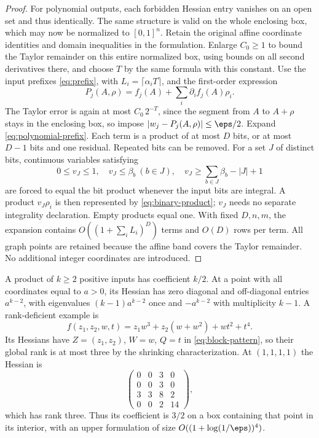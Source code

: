 \begin{proof}
For polynomial outputs, each forbidden Hessian entry vanishes on an
open set and thus identically. The same structure is valid on the
whole enclosing box, which may now be normalized to $[0,1]^n$.
Retain the original affine coordinate identities and domain
inequalities in the formulation. Enlarge $C_0\ge1$ to bound the Taylor
remainder on this entire normalized box, using bounds on all second
derivatives there, and choose $T$ by the same formula with this constant.
Use the input prefixes \eqref{eq:prefix}, with
$L_i=\lceil\alpha_iT\rceil$, and the first-order expression
\begin{equation}\label{eq:polynomial-prefix}
 P_j(A,\rho)=f_j(A)+\sum_i\partial_i f_j(A)\rho_i.
\end{equation}
The Taylor error is again at most $C_0\,2^{-T}$, since the segment
from $A$ to $A+\rho$ stays in the enclosing box, so impose
$|w_j-P_j(A,\rho)|\le\eps/2$. Expand \eqref{eq:polynomial-prefix}.
Each term is a product of at most $D$ bits, or at most $D-1$ bits and
one residual. Repeated bits can be removed. For a set $J$ of distinct
bits, continuous variables satisfying
\[
 0\le v_J\le1,\quad v_J\le\beta_b\ (b\in J),\quad
 v_J\ge\sum_{b\in J}\beta_b-|J|+1
\]
are forced to equal the bit product whenever the input bits are integral.
A product $v_J\rho_i$ is then represented by
\eqref{eq:binary-product}; $v_J$ needs no separate integrality declaration.
Empty products equal one. With fixed $D,n,m$, the expansion contains
$O((1+\sum_iL_i)^D)$ terms and $O(D)$ rows per term. All graph points
are retained because the affine band covers the Taylor remainder.
No additional integer coordinates are introduced.
\end{proof}

A product of $k\ge2$ positive inputs has coefficient $k/2$. At a point
with all coordinates equal to $a>0$, its Hessian has zero diagonal and
off-diagonal entries $a^{k-2}$, with eigenvalues
$(k-1)a^{k-2}$ once and $-a^{k-2}$ with multiplicity $k-1$.
A rank-deficient example is
\[
 f(z_1,z_2,w,t)=z_1w^3+z_2(w+w^2)+wt^2+t^4.
\]
Its Hessians have $Z=(z_1,z_2)$, $W=w$, $Q=t$ in
\eqref{eq:block-pattern}, so their global rank is at most three by the
shrinking characterization. At $(1,1,1,1)$ the Hessian is
\[
 \begin{pmatrix}0&0&3&0\\0&0&3&0\\3&3&8&2\\0&0&2&14\end{pmatrix},
\]
which has rank three. Thus its coefficient is $3/2$ on a box containing
that point in its interior, with an upper formulation of size
$O((1+\log(1/\eps))^4)$.

